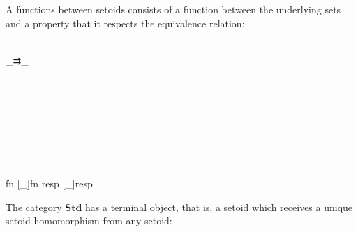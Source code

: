 A functions between setoids consists of a function between the underlying sets and a property that it respects the equivalence relation:

\begin{code}\>\<%
\\
\>  \_⇉\_\<%
\\
%
\\
\>  \AgdaSymbol{(}  \AgdaSymbol{:} \AgdaSymbol{)} \AgdaSymbol{:}  \<%
\\
\>[-1]\<[2]%
\>[2] \<%
\\
\>[0]\<[2]%
\>[2]\<%
\\
\>[2]\<[4]%
\>[4] \<[9]%
\>[9]\AgdaSymbol{:}       \<%
\\
\>[2]\<[4]%
\>[4] \AgdaSymbol{:} \AgdaSymbol{\{}  \AgdaSymbol{:}   \AgdaSymbol{\}}  \<[28]%
\>[28]\<%
\\
\>[4]\<[11]%
\>[11]\AgdaSymbol{(}\AgdaFunction{[}  \AgdaFunction{]}   \AgdaSymbol{)}  \<[27]%
\>[27]\<%
\\
\>[4]\<[11]%
\>[11]\AgdaFunction{[}  \AgdaFunction{]}     \<%
\\
\>    \AgdaSymbol{(}fn  [\_]fn \AgdaSymbol{;} resp  [\_]resp\AgdaSymbol{)}\<%
\\
\>\<\end{code}

The category $\textbf{Std}$ has a terminal object, that is, a setoid which receives a unique setoid homomorphism from any setoid:

